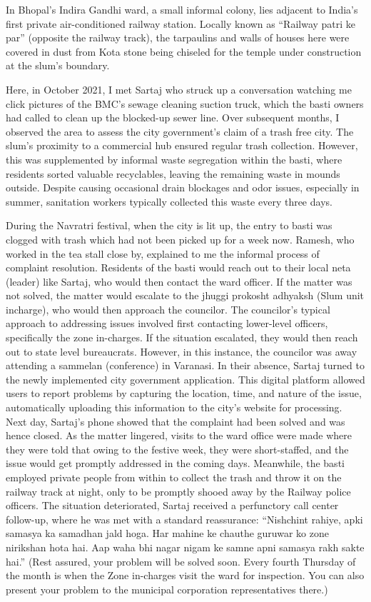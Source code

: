 In Bhopal's Indira Gandhi ward, a small informal colony, lies adjacent to India's first private air-conditioned railway station. Locally known as ``Railway patri ke par'' (opposite the railway track), the tarpaulins and walls of houses here were covered in dust from Kota stone being chiseled for the temple under construction at the slum's boundary.

Here, in October 2021, I met Sartaj who struck up a conversation watching me click pictures of the BMC's sewage cleaning suction truck, which the basti owners had called to clean up the blocked-up sewer line. Over subsequent months, I observed the area to assess the city government's claim of a trash free city. The slum's proximity to a commercial hub ensured regular trash collection. However, this was supplemented by informal waste segregation within the basti, where residents sorted valuable recyclables, leaving the remaining waste in mounds outside. Despite causing occasional drain blockages and odor issues, especially in summer, sanitation workers typically collected this waste every three days.

During the Navratri festival, when the city is lit up, the entry to basti was clogged with trash which had not been picked up for a week now. Ramesh, who worked in the tea stall close by, explained to me the informal process of complaint resolution. Residents of the basti would reach out to their local neta (leader) like Sartaj, who would then contact the ward officer. If the matter was not solved, the matter would escalate to the jhuggi prokosht adhyaksh (Slum unit incharge), who would then approach the councilor. The councilor's typical approach to addressing issues involved first contacting lower-level officers, specifically the zone in-charges. If the situation escalated, they would then reach out to state level bureaucrats. However, in this instance, the councilor was away attending a sammelan (conference) in Varanasi. In their absence, Sartaj turned to the newly implemented city government application. This digital platform allowed users to report problems by capturing the location, time, and nature of the issue, automatically uploading this information to the city's website for processing. Next day, Sartaj's phone showed that the complaint had been solved and was hence closed. As the matter lingered, visits to the ward office were made where they were told that owing to the festive week, they were short-staffed, and the issue would get promptly addressed in the coming days. Meanwhile, the basti employed private people from within to collect the trash and throw it on the railway track at night, only to be promptly shooed away by the Railway police officers. The situation deteriorated, Sartaj received a perfunctory call center follow-up, where he was met with a standard reassurance: ``Nishchint rahiye, apki samasya ka samadhan jald hoga. Har mahine ke chauthe guruwar ko zone nirikshan hota hai. Aap waha bhi nagar nigam ke samne apni samasya rakh sakte hai.'' (Rest assured, your problem will be solved soon. Every fourth Thursday of the month is when the Zone in-charges visit the ward for inspection. You can also present your problem to the municipal corporation representatives there.)

